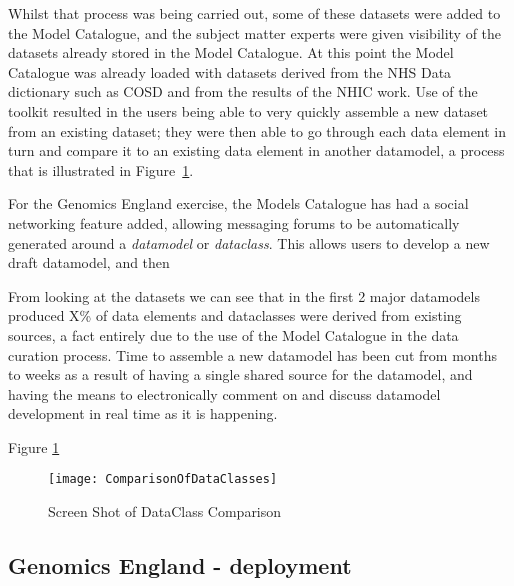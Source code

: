 Whilst that process was being carried out, some of these datasets were added to the Model Catalogue, and the subject matter experts were given visibility of the datasets already stored in the Model Catalogue. At this point the Model Catalogue was already loaded with datasets derived from the NHS Data dictionary such as COSD and from the results of the NHIC work. Use of the toolkit resulted in the users being able to very quickly assemble a new dataset from an existing dataset; they were then able to go through each data element in turn and compare it to an existing data element in another datamodel, a process that is illustrated in Figure~\ref{fig:dataClassComparison}.

For the Genomics England exercise, the Models Catalogue has had a social networking feature added, allowing messaging forums to be automatically generated around a \emph{datamodel} or \emph{dataclass}. This allows users to develop a new draft datamodel, and then 

From looking at the datasets we can see that in the first 2 major datamodels produced X\% of data elements and dataclasses were derived from existing sources, a fact entirely due to the use of the Model Catalogue in the data curation process. Time to assemble a new datamodel has been cut from months to weeks as a result of having a single shared source for the datamodel, and having the means to electronically comment on and discuss datamodel development in real time as it is happening.



 Figure \ref{fig:dataClassComparison}
 \begin{figure}[here]
 	\texttt{[image: ComparisonOfDataClasses]}
 	\caption{Screen Shot of DataClass Comparison} 
 	\label{fig:dataClassComparison}	
 \end{figure}



\subsection{Genomics England -  deployment}
